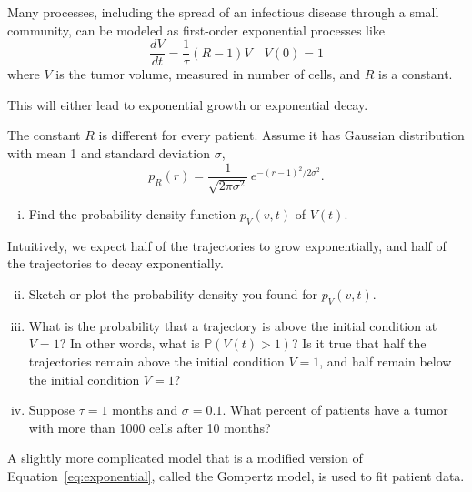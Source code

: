 \documentclass[12pt,letterpaper]{article}
\begin{document}



Many processes, including the spread of an infectious disease through a small community, can be modeled as first-order exponential processes like
\begin{equation*}
\frac{dV}{dt} = \frac{1}{\tau}\left(R-1\right) V \quad V(0)=1 \label{eq:exponential}
\end{equation*}
where $V$ is the tumor volume, measured in number of cells, and $R$ is a constant.

This will either lead to exponential growth or exponential decay.

The constant $R$ is different for every patient.
Assume it has Gaussian distribution with mean 1 and standard deviation $\sigma$,
\begin{equation*}
p_R(r) = \frac{1}{\sqrt{2\pi \sigma^2}}\, e^{-\left(r-1\right)^2/2\sigma^2}.
\end{equation*}

\begin{enumerate}[i. ]
\item Find the probability density function $p_V(v,t)$ of $V(t)$.
\end{enumerate}

Intuitively, we expect half of the trajectories to grow exponentially, and half of the trajectories to decay exponentially.

\begin{enumerate}[i. ]
\setcounter{enumi}{1}
\item Sketch or plot the probability density you found for $p_V(v,t)$.
\item What is the probability that a trajectory is above the initial condition at $V=1$? In other words, what is $\mathbb{P}(V(t)>1)$? Is it true that half the trajectories remain above the initial condition $V=1$, and half remain below the initial condition $V=1$? 
\item Suppose $\tau= 1$ months and $\sigma = 0.1$. What percent of patients have a tumor with more than 1000 cells after 10 months?
\end{enumerate}

A slightly more complicated model that is a modified version of Equation~\ref{eq:exponential}, called the Gompertz model, is used to fit patient data. 

\end{document}
